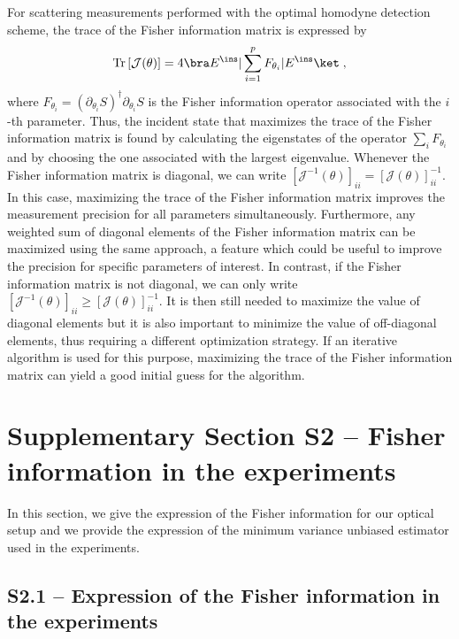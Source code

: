 \documentclass[aps,pra,twocolumn,amsmath,amssymb,superscriptaddress,10pt,nobibnotes]{revtex4-2}
\begin{document}
For scattering measurements performed with the optimal homodyne detection scheme, the trace of the Fisher information matrix is expressed by
\begin{equation}
\operatorname{Tr} \left[ \mathcal{J}(\theta) \right] = 4  \bra E^\ins | \sum_{i=1}^p F_{\theta_i} | E^\ins  \ket \; ,
\end{equation}
where $F_{\theta_i}= (\partial_{\theta_i} S) ^\dagger \partial_{\theta_i} S $ is the Fisher information operator associated with the $i$-th parameter. Thus, the incident state that maximizes the trace of the Fisher information matrix is found by calculating the eigenstates of the operator $\sum_i F_{\theta_i}$ and by choosing the one associated with the largest eigenvalue. Whenever the Fisher information matrix is diagonal, we can write $[ \mathcal{J}^{-1}(\theta)]_{ii} = [ \mathcal{J}(\theta)]_{ii}^{-1} $. In this case, maximizing the trace of the Fisher information matrix improves the measurement precision for all parameters simultaneously. Furthermore, any weighted sum of diagonal elements of the Fisher information matrix can be maximized using the same approach, a feature which could be useful to improve the precision for specific parameters of interest. In contrast, if the Fisher information matrix is not diagonal, we can only write $[ \mathcal{J}^{-1}(\theta)]_{ii} \geq [ \mathcal{J}(\theta)]_{ii}^{-1} $. It is then still needed to maximize the value of diagonal elements but it is also important to minimize the value of off-diagonal elements, thus requiring a different optimization strategy. If an iterative algorithm is used for this purpose, maximizing the trace of the Fisher information matrix can yield a good initial guess for the algorithm. 



\section*{Supplementary Section S2 -- Fisher information in the experiments}

In this section, we give the expression of the Fisher information for our optical setup and we provide the expression of the minimum variance unbiased estimator used in the experiments. 


\subsection*{S2.1 -- Expression of the Fisher information in the experiments}
\end{document}
